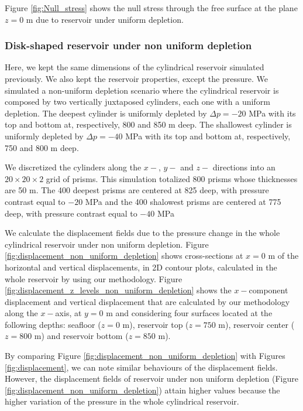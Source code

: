 \documentclass[journal abbreviation, manuscript]{copernicus}
\begin{document}
Figure \ref{fig:Null_stress} shows the null stress through the free surface at the 
plane $z=0$ m due to reservoir under uniform depletion.



\subsubsection{Disk-shaped reservoir under non uniform depletion}

Here, we kept the same dimensions of the cylindrical reservoir simulated previously.
We also kept the  reservoir properties, except the pressure.
We simulated a non-uniform depletion scenario where the cylindrical reservoir is composed by two vertically juxtaposed cylinders, each one with a uniform depletion.
The deepest cylinder is uniformly depleted by $\Delta p = -20$ MPa with its top and bottom at, respectively, 800 and 850 m deep.
The shallowest cylinder is uniformly depleted by $\Delta p = -40$ MPa with its top and bottom at, respectively, 750 and 800 m deep.

We  discretized the cylinders  along the $x-$, $y-$ and $z-$ directions into an $20 \times 20 \times 2$ grid of prisms.
This simulation totalized 800 prisms whose thicknesses are 50 m.
The 400 deepest prisms are centered at 825 deep, with pressure contrast equal to $-20$ MPa and the 400 shalowest prisms are centered at 775 deep, with pressure contrast equal to $-40$ MPa  

We calculate the displacement fields due to the pressure change in the whole cylindrical reservoir under non uniform depletion.
Figure \ref{fig:displacement_non_uniform_depletion} shows cross-sections at $x  = 0$ m of the horizontal and vertical displacements, in 2D contour plots, calculated in the whole reservoir by using our methodology.
Figure \ref{fig:displacement_z_levels_non_uniform_depletion} shows the $x-$component displacement and vertical displacement that are calculated by our methodology along the 
$x-$axis, at $y = 0$ m and considering four surfaces located at the following depths:  seafloor ($z = 0$ m), reservoir top ($z = 750$ m), reservoir center ($z = 800$ m) and reservoir bottom ($z = 850$ m).

By comparing Figure \ref{fig:displacement_non_uniform_depletion} with Figures \ref{fig:displacement}, we can note similar behaviours of the displacement fields.
However,  the displacement fields of reservoir under non uniform depletion (Figure \ref{fig:displacement_non_uniform_depletion}) attain higher values because the higher variation of the pressure in the whole cylindrical reservoir.
\end{document}
